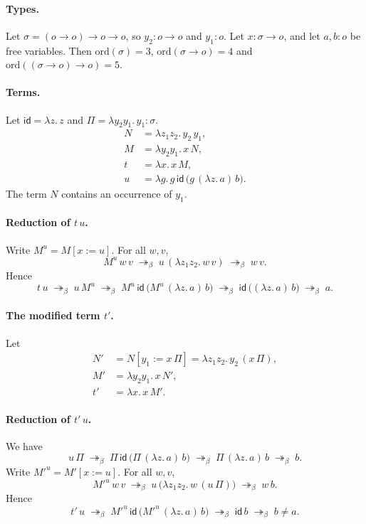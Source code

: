 \documentclass{article}
\newcommand{\red}{\twoheadrightarrow_\beta}
\newcommand{\id}{\mathsf{id}}
\begin{document}
\paragraph{Types.}
Let $\sigma = (o\to o)\to o\to o$, so $y_2 : o\to o$ and $y_1 : o$.
Let $x : \sigma\to o$, and let $a, b : o$ be free variables.
Then $\mathrm{ord}(\sigma) = 3$, $\mathrm{ord}(\sigma\to o) = 4$ and
$\mathrm{ord}((\sigma\to o)\to o) = 5$.

\paragraph{Terms.}
Let $\id = \lambda z.\,z$ and $\Pi = \lambda y_2 y_1.\,y_1 : \sigma$.
\begin{align*}
  N &= \lambda z_1 z_2.\, y_2\, y_1, \\
  M &= \lambda y_2 y_1.\, x\, N, \\
  t &= \lambda x.\, x\, M, \\
  u &= \lambda g.\, g\, \id\, \bigl(g\, (\lambda z.\,a)\, b\bigr).
\end{align*}
The term $N$ contains an occurrence of $y_1$.

\paragraph{Reduction of $t\,u$.}
Write $M^u = M[x := u]$. For all $w, v$,
\[
  M^u\, w\, v \;\red\; u\, (\lambda z_1 z_2.\, w\, v) \;\red\; w\, v .
\]
Hence
\[
  t\,u \;\red\; u\, M^u \;\red\; M^u\, \id\, \bigl(M^u\, (\lambda z.\,a)\, b\bigr)
  \;\red\; \id\, \bigl((\lambda z.\,a)\, b\bigr) \;\red\; a .
\]

\paragraph{The modified term $t'$.}
Let
\begin{align*}
  N' &= N[y_1 := x\,\Pi] = \lambda z_1 z_2.\, y_2\, (x\,\Pi), \\
  M' &= \lambda y_2 y_1.\, x\, N', \\
  t' &= \lambda x.\, x\, M'.
\end{align*}

\paragraph{Reduction of $t'\,u$.}
We have
\[
  u\,\Pi \;\red\; \Pi\, \id\, \bigl(\Pi\, (\lambda z.\,a)\, b\bigr)
  \;\red\; \Pi\, (\lambda z.\,a)\, b \;\red\; b .
\]
Write $M'^u = M'[x := u]$. For all $w, v$,
\[
  M'^u\, w\, v \;\red\; u\, \bigl(\lambda z_1 z_2.\, w\, (u\,\Pi)\bigr) \;\red\; w\, b .
\]
Hence
\[
  t'\,u \;\red\; M'^u\, \id\, \bigl(M'^u\, (\lambda z.\,a)\, b\bigr)
  \;\red\; \id\, b \;\red\; b \neq a .
\]
\end{document}
